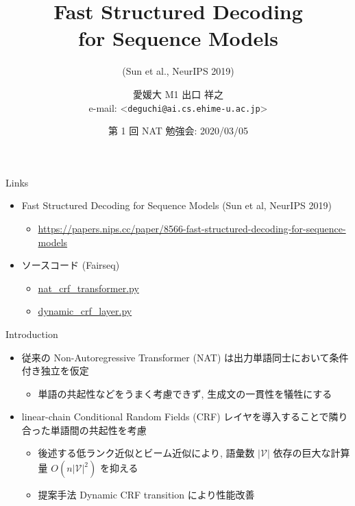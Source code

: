 \documentclass[unicode, 12pt, aspectratio=43]{beamer}
\author{愛媛大 M1 出口 祥之 \\ \small{e-mail: <\texttt{deguchi@ai.cs.ehime-u.ac.jp}>}}
\date{第 1 回 NAT 勉強会: 2020/03/05}
\title{Fast Structured Decoding \\ for Sequence Models}
\subtitle{(Sun et al., NeurIPS 2019)}
\begin{document}
\maketitle

\begin{frame}[label={sec:orgfba643f}]{Links}
\begin{itemize}
\item Fast Structured Decoding for Sequence Models (Sun et al, NeurIPS 2019)
\begin{itemize}
\item \href{https://papers.nips.cc/paper/8566-fast-structured-decoding-for-sequence-models}{\url{https://papers.nips.cc/paper/8566-fast-structured-decoding-for-sequence-models}}
\end{itemize}

\item ソースコード (Fairseq)
\begin{itemize}
\item \href{https://github.com/pytorch/fairseq/blob/master/fairseq/models/nat/nat\_crf\_transformer.py}{\url{nat_crf_transformer.py}}
\item \href{https://github.com/pytorch/fairseq/blob/master/fairseq/modules/dynamic\_crf\_layer.py}{\url{dynamic_crf_layer.py}}
\end{itemize}
\end{itemize}
\end{frame}

\begin{frame}[label={sec:orgd409ac1}]{Introduction}
\begin{itemize}
\item 従来の Non-Autoregressive Transformer (NAT) は出力単語同士において条件付き独立を仮定
\begin{itemize}
\item 単語の共起性などをうまく考慮できず, 生成文の一貫性を犠牲にする
\end{itemize}

\item linear-chain Conditional Random Fields (CRF) レイヤを導入することで隣り合った単語間の共起性を考慮
\begin{itemize}
\item 後述する低ランク近似とビーム近似により, 語彙数 \(|\mathcal{V}|\) 依存の巨大な計算量 \(O(n|\mathcal{V}|^2)\) を抑える
\item 提案手法 Dynamic CRF transition により性能改善
\end{itemize}
\end{itemize}
\end{frame}
\end{document}
